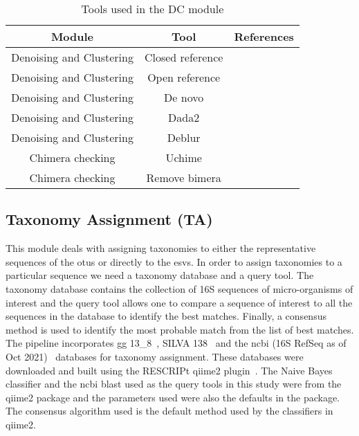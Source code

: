  \begin{table}[h]
    \centering
    \small
    \begin{tabular}{|c|c|c|}
      \hline
      \textbf{Module} & \textbf{Tool} & \textbf{References} \\
      \hline
      Denoising and Clustering & Closed reference & \cite{rognesVSEARCHVersatileOpen2016,bolyenReproducibleInteractiveScalable2019} \\
      Denoising and Clustering & Open reference & \cite{rognesVSEARCHVersatileOpen2016,bolyenReproducibleInteractiveScalable2019} \\
      Denoising and Clustering & De novo & \cite{rognesVSEARCHVersatileOpen2016,bolyenReproducibleInteractiveScalable2019} \\
      Denoising and Clustering & Dada2 & \cite{Callahan2016} \\
      Denoising and Clustering & Deblur & \cite{Amir2017,bolyenReproducibleInteractiveScalable2019} \\
      \hline
      Chimera checking & Uchime & \cite{rognesVSEARCHVersatileOpen2016,bolyenReproducibleInteractiveScalable2019} \\
      Chimera checking & Remove bimera & \cite{Callahan2016} \\
      \hline
    \end{tabular}
    \caption{Tools used in the DC module}
    \label{tab:dc_tools}
  \end{table}

  \subsection*{Taxonomy Assignment (TA)}
  \vspace{-5mm}
  This module deals with assigning taxonomies to either the representative sequences of the \ac{otu}s or directly to the \ac{esv}s.
  In order to assign taxonomies to a particular sequence we need a taxonomy database and a query tool.
  The taxonomy database contains the collection of 16S sequences of micro-organisms of interest and the query tool allows one to compare a sequence of interest to all the sequences in the database to identify the best matches.
  Finally, a consensus method is used to identify the most probable match from the list of best matches.
  The pipeline incorporates \ac{gg} 13\_8~\cite{DeSantis2006}, SILVA 138~\cite{Quast2012} and the \ac{ncbi} (16S RefSeq as of Oct 2021)~\cite{Sayers2009} databases for taxonomy assignment.
  These databases were downloaded and built using the RESCRIPt qiime2 plugin~\cite{iiRESCRIPtReproducibleSequence2021}.
  The Naive Bayes classifier and the \ac{ncbi} blast used as the query tools in this study were from the \ac{qiime2} package and the parameters used were also the defaults in the package.
  The consensus algorithm used is the default method used by the classifiers in \ac{qiime2}.

